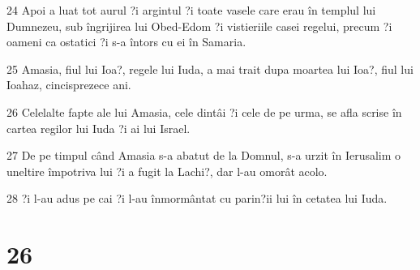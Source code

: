 \par 24 Apoi a luat tot aurul ?i argintul ?i toate vasele care erau în templul lui Dumnezeu, sub îngrijirea lui Obed-Edom ?i vistieriile casei regelui, precum ?i oameni ca ostatici ?i s-a întors cu ei în Samaria.
\par 25 Amasia, fiul lui Ioa?, regele lui Iuda, a mai trait dupa moartea lui Ioa?, fiul lui Ioahaz, cincisprezece ani.
\par 26 Celelalte fapte ale lui Amasia, cele dintâi ?i cele de pe urma, se afla scrise în cartea regilor lui Iuda ?i ai lui Israel.
\par 27 De pe timpul când Amasia s-a abatut de la Domnul, s-a urzit în Ierusalim o uneltire împotriva lui ?i a fugit la Lachi?, dar l-au omorât acolo.
\par 28 ?i l-au adus pe cai ?i l-au înmormântat cu parin?ii lui în cetatea lui Iuda.

\chapter{26}

